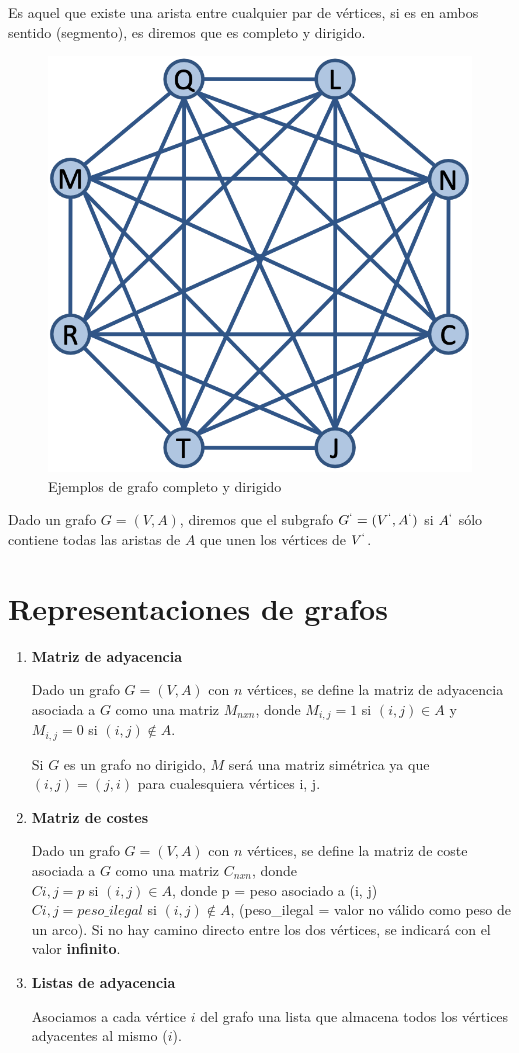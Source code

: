  Es aquel que existe una arista entre cualquier par de vértices, si es en ambos sentido (segmento), es diremos que es completo y dirigido.
\begin{figure}[h]
  \begin{center}
    \includegraphics[width=.3\textwidth]{assets/intrografo6.png}
  \end{center}
  \caption{Ejemplos de grafo completo y dirigido}
\end{figure}

 Dado un grafo \(G = (V,A)\), diremos que el subgrafo \(G^` = (V^`,A^`)\) si \(A^`\) sólo contiene todas las aristas de \(A\) que unen los vértices de \(V^`\).

\section{Representaciones de grafos}
\begin{enumerate}
  \item \large\textbf{Matriz de adyacencia}
  
  Dado un grafo \(G = (V,A)\) con \(n\) vértices, se define la matriz de adyacencia asociada a \(G\) como una matriz \(M_{nxn}\), donde \(M_{i,j} = 1\) si \((i,j) \in A\) y \(M_{i,j} = 0\) si \((i,j) \notin A\).

  Si \(G\) es un grafo no dirigido, \(M\) será una matriz simétrica ya que \((i,j) =(j,i)\) para cualesquiera vértices i, j.

  \item \large\textbf{Matriz de costes}
  
  Dado un grafo \(G = (V,A)\) con \(n\) vértices, se define la matriz de coste asociada a \(G\) como una matriz \(C_{nxn}\), donde\\ \(Ci,j = p\) si \((i, j) \in A\), donde p = peso asociado a (i, j)\\
  \(Ci,j = peso\_ilegal\) si \((i, j) \notin A\), (peso\_ilegal = valor no válido como peso de un arco).
  Si no hay camino directo entre los dos vértices, se indicará con el valor \textbf{infinito}.
  \item \large\textbf{Listas de adyacencia}
  
  Asociamos a cada vértice \(i\) del grafo una lista que almacena todos los vértices adyacentes al mismo (\(i\)).
\end{enumerate}
